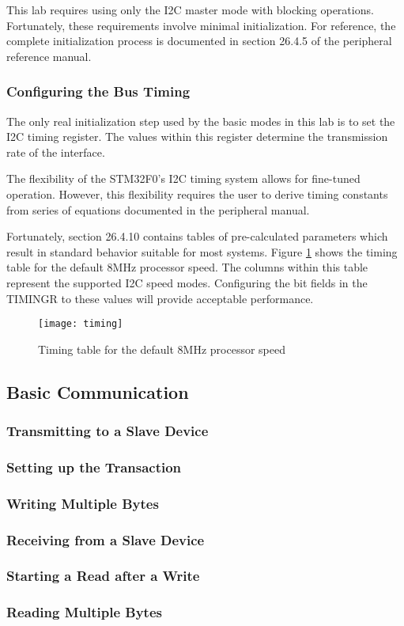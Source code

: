 \documentclass[11pt,fleqn]{book} %
\begin{document}
    This lab requires using only the I2C master mode with blocking operations. Fortunately, these requirements involve minimal initialization. For reference, the complete initialization process is documented in section 26.4.5 of the peripheral reference manual. 
     
    \subsubsection{Configuring the Bus Timing}
    The only real initialization step used by the basic modes in this lab is to set the I2C timing register. The values within this register determine the transmission rate of the interface. 
    
    The flexibility of the STM32F0's I2C timing system allows for fine-tuned operation. However, this flexibility requires the user to derive timing constants from series of equations documented in the peripheral manual. 
    
    Fortunately, section 26.4.10 contains tables of pre-calculated parameters which result in standard behavior suitable for most systems. Figure \ref{timing} shows the timing table for the default 8MHz processor speed. The columns within this table represent the supported  I2C speed modes. Configuring the bit fields in the TIMINGR to these values will provide acceptable performance.  

    \begin{figure}[]
        \centering\texttt{[image: timing]}
        \caption{Timing table for the default 8MHz processor speed}
        \label{timing}
    \end{figure}


\subsection{Basic Communication}
\subsubsection{Transmitting to a Slave Device}
\subsubsection{Setting up the Transaction}

\subsubsection{Writing Multiple Bytes}

\subsubsection{Receiving from a Slave Device}
\subsubsection{Starting a Read after a Write}
\subsubsection{Reading Multiple Bytes}
\end{document}
